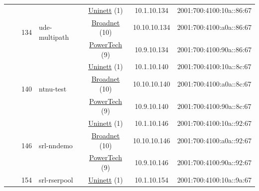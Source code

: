 \begin{small}
\begin{center}
\begin{longtable}{|c|c|c|c|c|c|c|c|}
  &  & \multirow{3}{*}{\tiny{134}} & \multicolumn{1}{|l|}{\multirow{3}{*}{\tiny{ude-multipath}}} & \multicolumn{2}{|c|}{\tiny{\href{https://www.uninett.no}{Uninett} (1)}} & \tiny{10.1.10.134} & \tiny{2001:700:4100:10a::86:67} \\* \cline{5-5}\cline{6-6}\cline{7-7}\cline{8-8}
  &  &  &  & \multicolumn{2}{|c|}{\tiny{\href{https://www.broadnet.no}{Broadnet} (10)}} & \tiny{10.10.10.134} & \tiny{2001:700:4100:a0a::86:67} \\* \cline{5-5}\cline{6-6}\cline{7-7}\cline{8-8}
  &  &  &  & \multicolumn{2}{|c|}{\tiny{\href{http://www.powertech.no}{PowerTech} (9)}} & \tiny{10.9.10.134} & \tiny{2001:700:4100:90a::86:67} \\* \cline{3-3}\cline{4-4}\cline{5-5}\cline{6-6}\cline{7-7}\cline{8-8}
  &  & \multirow{3}{*}{\tiny{140}} & \multicolumn{1}{|l|}{\multirow{3}{*}{\tiny{ntnu-test}}} & \multicolumn{2}{|c|}{\tiny{\href{https://www.uninett.no}{Uninett} (1)}} & \tiny{10.1.10.140} & \tiny{2001:700:4100:10a::8c:67} \\* \cline{5-5}\cline{6-6}\cline{7-7}\cline{8-8}
  &  &  &  & \multicolumn{2}{|c|}{\tiny{\href{https://www.broadnet.no}{Broadnet} (10)}} & \tiny{10.10.10.140} & \tiny{2001:700:4100:a0a::8c:67} \\* \cline{5-5}\cline{6-6}\cline{7-7}\cline{8-8}
  &  &  &  & \multicolumn{2}{|c|}{\tiny{\href{http://www.powertech.no}{PowerTech} (9)}} & \tiny{10.9.10.140} & \tiny{2001:700:4100:90a::8c:67} \\* \cline{3-3}\cline{4-4}\cline{5-5}\cline{6-6}\cline{7-7}\cline{8-8}
  &  & \multirow{3}{*}{\tiny{146}} & \multicolumn{1}{|l|}{\multirow{3}{*}{\tiny{srl-nndemo}}} & \multicolumn{2}{|c|}{\tiny{\href{https://www.uninett.no}{Uninett} (1)}} & \tiny{10.1.10.146} & \tiny{2001:700:4100:10a::92:67} \\* \cline{5-5}\cline{6-6}\cline{7-7}\cline{8-8}
  &  &  &  & \multicolumn{2}{|c|}{\tiny{\href{https://www.broadnet.no}{Broadnet} (10)}} & \tiny{10.10.10.146} & \tiny{2001:700:4100:a0a::92:67} \\* \cline{5-5}\cline{6-6}\cline{7-7}\cline{8-8}
  &  &  &  & \multicolumn{2}{|c|}{\tiny{\href{http://www.powertech.no}{PowerTech} (9)}} & \tiny{10.9.10.146} & \tiny{2001:700:4100:90a::92:67} \\* \cline{3-3}\cline{4-4}\cline{5-5}\cline{6-6}\cline{7-7}\cline{8-8}
  &  & \multirow{3}{*}{\tiny{154}} & \multicolumn{1}{|l|}{\multirow{3}{*}{\tiny{srl-rserpool}}} & \multicolumn{2}{|c|}{\tiny{\href{https://www.uninett.no}{Uninett} (1)}} & \tiny{10.1.10.154} & \tiny{2001:700:4100:10a::9a:67} \\* \cline{5-5}\cline{6-6}\cline{7-7}\cline{8-8}

\end{longtable}
\end{center}
\end{small}
